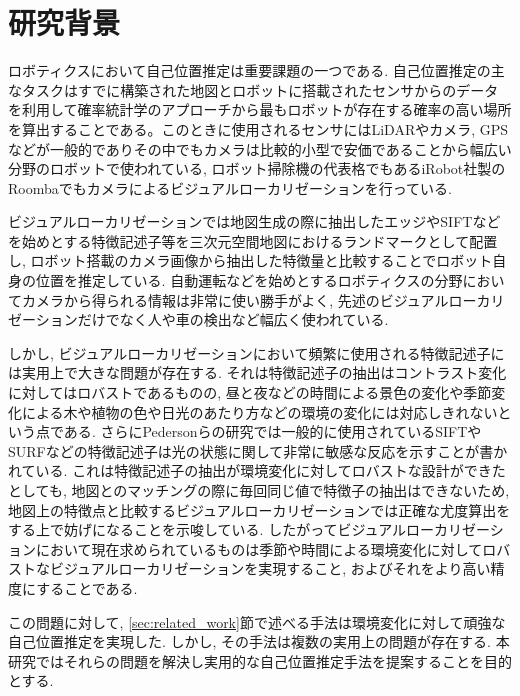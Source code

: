\newpage
 
 \section{研究背景}
 ロボティクスにおいて自己位置推定は重要課題の一つである\cite{thrun2005probabilistic}. 自己位置推定の主なタスクはすでに構築された地図とロボットに搭載されたセンサからのデータを利用して確率統計学のアプローチから最もロボットが存在する確率の高い場所を算出することである。このときに使用されるセンサにはLiDARやカメラ, GPSなどが一般的でありその中でもカメラは比較的小型で安価であることから幅広い分野のロボットで使われている, ロボット掃除機の代表格でもあるiRobot社製のRoombaでもカメラによるビジュアルローカリゼーションを行っている\cite{Roomba_vSLAM}. \par ビジュアルローカリゼーションでは地図生成の際に抽出したエッジ\cite{Wuhan_Edge_Locali}やSIFTなどを始めとする特徴記述子等を三次元空間地図におけるランドマークとして配置し, ロボット搭載のカメラ画像から抽出した特徴量と比較することでロボット自身の位置を推定している\cite{vslam_survey}. 自動運転などを始めとするロボティクスの分野においてカメラから得られる情報は非常に使い勝手がよく, 先述のビジュアルローカリゼーションだけでなく人や車の検出など幅広く使われている\cite{DeepLab}. \par しかし, ビジュアルローカリゼーションにおいて頻繁に使用される特徴記述子には実用上で大きな問題が存在する. それは特徴記述子の抽出はコントラスト変化に対してはロバストであるものの, 昼と夜などの時間による景色の変化や季節変化による木や植物の色や日光のあたり方などの環境の変化には対応しきれないという点である\cite{Image_Recog_Kodansha}. さらにPedersonらの研究\cite{FeatureDescriptor}では一般的に使用されているSIFTやSURFなどの特徴記述子は光の状態に関して非常に敏感な反応を示すことが書かれている. 
これは特徴記述子の抽出が環境変化に対してロバストな設計ができたとしても, 地図とのマッチングの際に毎回同じ値で特徴子の抽出はできないため, 地図上の特徴点と比較するビジュアルローカリゼーションでは正確な尤度算出をする上で妨げになることを示唆している. したがってビジュアルローカリゼーションにおいて現在求められているものは季節や時間による環境変化に対してロバストなビジュアルローカリゼーションを実現すること, およびそれをより高い精度にすることである. \par この問題に対して, \ref{sec:related_work}節で述べる手法は環境変化に対して頑強な自己位置推定を実現した. しかし, その手法は複数の実用上の問題が存在する. 本研究ではそれらの問題を解決し実用的な自己位置推定手法を提案することを目的とする.
 
